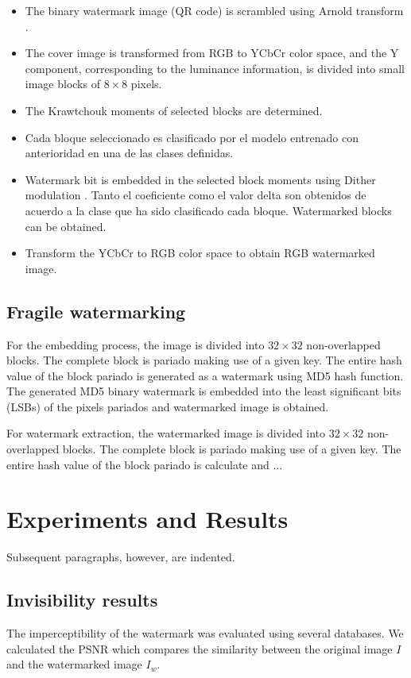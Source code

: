 \documentclass[runningheads]{llncs}
\begin{document}
\begin{itemize}
	\item[\checkmark] The binary watermark image (QR code) is scrambled using Arnold transform \cite{Arnol'd:1987366}.
	\item[\checkmark] The cover image is transformed from RGB to YCbCr color space, and the Y component, corresponding to the luminance information, is divided into small image blocks of $8\times 8$ pixels.
	\item[\checkmark] The Krawtchouk moments \cite{Yap2003} of selected blocks are determined.
	\item[\checkmark] Cada bloque seleccionado es clasificado por el modelo entrenado con anterioridad en una de las clases definidas.
	\item[\checkmark] Watermark bit is embedded in the selected block moments using Dither modulation \cite{chen2001quantization}. Tanto el coeficiente como el valor delta son obtenidos de acuerdo a la clase que ha sido clasificado cada bloque. Watermarked blocks can be obtained. 
	\item[\checkmark] Transform the YCbCr to RGB color space to obtain RGB watermarked image.
\end{itemize}

\subsection{Fragile watermarking}
For the embedding process, the image is divided into $32\times 32$ non-overlapped blocks. The complete block is pariado making use of a given key. The entire hash value of the block pariado is generated as a watermark using MD5 hash function. The generated MD5 binary watermark is embedded into the least significant bits (LSBs) of the pixels pariados and watermarked image is obtained.

For watermark extraction, the watermarked image is divided into $32\times 32$ non-overlapped blocks. The complete block is pariado making use of a given key. The entire hash value of the block pariado is calculate and ...

\section{Experiments and Results}
Subsequent paragraphs, however, are indented.

\subsection{Invisibility results}
The imperceptibility of the watermark was evaluated using several databases. We calculated the PSNR which compares the similarity between the original image $ I $ and the watermarked image $ I_w $.
\end{document}
